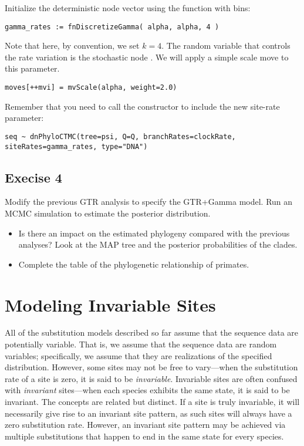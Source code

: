 Initialize the  deterministic node vector using the   function with  bins:
{\tt \begin{snugshade*}
\begin{lstlisting}
gamma_rates := fnDiscretizeGamma( alpha, alpha, 4 )
\end{lstlisting}
\end{snugshade*}}

Note that here, by convention, we set $k = 4$.
The random variable that controls the rate variation is the stochastic node . 
We will apply a simple scale move to this parameter.
{\tt \begin{snugshade*}
\begin{lstlisting}
moves[++mvi] = mvScale(alpha, weight=2.0)
\end{lstlisting}
\end{snugshade*}}

Remember that you need to call the  constructor to include the new site-rate parameter:
{\tt \begin{snugshade*}
\begin{lstlisting}
seq ~ dnPhyloCTMC(tree=psi, Q=Q, branchRates=clockRate, siteRates=gamma_rates, type="DNA")
\end{lstlisting}
\end{snugshade*}}


\subsection{Execise 4}

Modify the previous GTR analysis to specify the GTR+Gamma model. 
Run an MCMC simulation to estimate the posterior distribution.
\begin{itemize}
\item Is there an impact on the estimated phylogeny compared with the previous analyses? 
	Look at the MAP tree and the posterior probabilities of the clades.
\item Complete the table of the phylogenetic relationship of primates.
\end{itemize}



\newpage
\section{Modeling Invariable Sites}
All of the substitution models described so far assume that the sequence data are potentially variable.
That is, we assume that the sequence data are random variables; specifically, we assume that they are realizations of the specified  distribution. 
However, some sites may not be free to vary---when the substitution rate of a site is zero, it is said to be \emph{invariable}.
Invariable sites are often confused with \emph{invariant} sites---when each species exhibits the same state, it is said to be invariant.
The concepts are related but distinct.
If a site is truly invariable, it will necessarily give rise to an invariant site pattern, as such sites will always have a zero substitution rate.
However, an invariant site pattern may be achieved via multiple substitutions that happen to end in the same state for every species.

